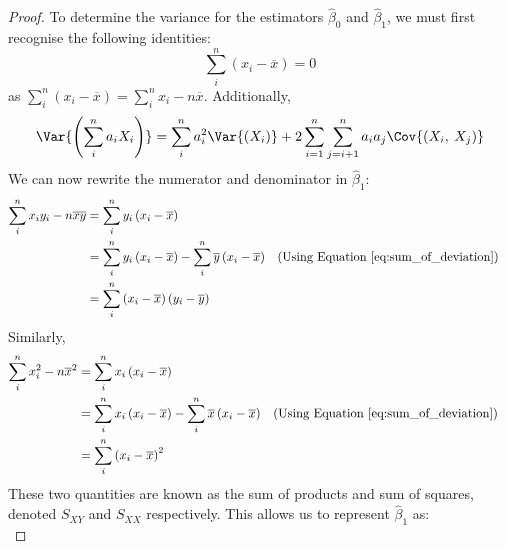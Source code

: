 \documentclass{article}
\begin{document}
\begin{proof}
    To determine the variance for the estimators $\hat{\beta}_0$ and $\hat{\beta}_1$, we must first recognise the following identities:
    \begin{equation}
        \sum_i^n \left( x_i - \overline{x} \right) = 0 \label{eq:sum_of_deviation}
    \end{equation}
    as $\sum_i^n \left( x_i - \overline{x} \right) = \sum_i^n x_i - n \overline{x}$.
    Additionally,
    \begin{equation}
        \Var{\left(\sum_{i}^n a_iX_i\right)} = \sum_i^na_i^2 \Var{\left(X_i\right)} + 2\sum_{i=1}^n\sum_{j=i+1}^na_ia_j\Cov{\left(X_i,\:X_j\right)} \label{eq:variance_of_weighted_sums}
    \end{equation}
    We can now rewrite the numerator and denominator in $\hat{\beta}_1$:
    \begin{align*}
        \sum_i^n x_i y_i - n \overline{x} \overline{y} & = \sum_i^n y_i \left( x_i - \overline{x} \right)                                                                                                                  \\
                                                       & = \sum_i^n y_i \left( x_i - \overline{x} \right) - \sum_i^n \overline{y} \left( x_i - \overline{x} \right) &  & \text{(Using Equation \ref{eq:sum_of_deviation})} \\
                                                       & = \sum_i^n \left( x_i - \overline{x} \right) \left( y_i - \overline{y} \right)
    \end{align*}
    Similarly,
    \begin{align*}
        \sum_i^n x_i^2- n \overline{x}^2 & = \sum_i^n x_i \left( x_i - \overline{x} \right)                                                                                                                  \\
                                         & = \sum_i^n x_i \left( x_i - \overline{x} \right) - \sum_i^n \overline{x} \left( x_i - \overline{x} \right) &  & \text{(Using Equation \ref{eq:sum_of_deviation})} \\
                                         & = \sum_i^n \left( x_i - \overline{x} \right)^2
    \end{align*}
    These two quantities are known as the sum of products and sum of squares, denoted $S_{XY}$ and $S_{XX}$ respectively.
    This allows us to represent $\hat{\beta}_1$ as:
    \begin{equation*}

\end{equation*}
\end{proof}
\end{document}
